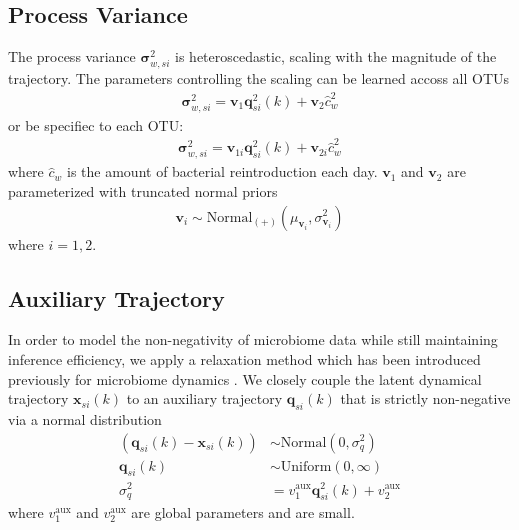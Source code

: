 \documentclass{article}
\newcommand{\var}{\sigma^2}
\newcommand{\Normaldist}{\text{Normal}}
\newcommand{\Uniformdist}{\text{Uniform}}
\newcommand{\x}[2]{\mathbf{x}_{#2}(#1)}
\newcommand{\q}[2]{\mathbf{q}_{#2}(#1)}
\newcommand{\qexp}[3]{\mathbf{q}^{#3}_{#2}(#1)}
\newcommand{\varcoupling}{\var_q}
\newcommand{\varw}[1]{\mathbf{\sigma}^2_{w,{}#1}}
\newcommand{\cw}{\hat{c}_w}
\renewcommand{\v}[1]{\mathbf{v}_{#1}}
\begin{document}
\subsection{Process Variance}
The process variance $\varw{si}$ is heteroscedastic, scaling with the magnitude of the trajectory. The parameters controlling the scaling can be learned accoss all OTUs
\begin{align}
  \varw{si} = \v{1} \qexp{k}{si}{2} + \v{2} \cw^2
\end{align}
or be specifiec to each OTU:
\begin{align}
  \varw{si} = \v{1i} \qexp{k}{si}{2} + \v{2i} \cw^2
\end{align}
where $\cw$ is the amount of bacterial reintroduction each day. $\v{1}$ and $\v{2}$ are parameterized with truncated normal priors
\begin{align}
  \v{i} \sim \Normaldist_{(+)} (\mu_{\v{i}}, \sigma^2_{\v{i}})
\end{align}
where $i=1,2$.

\subsection{Auxiliary Trajectory}
In order to model the non-negativity of microbiome data while still maintaining inference efficiency, we apply a relaxation method which has been introduced previously for microbiome dynamics \cite{cite:gibsonICML}. We closely couple the latent dynamical trajectory $\x{k}{si}$ to an auxiliary trajectory $\q{k}{si}$ that is strictly non-negative via a normal distribution
\begin{align}
  \label{eqn:x_q_coupling_var}
  ( \q{k}{si} - \x{k}{si} ) & \sim \Normaldist (0, \varcoupling) \\
  \q{k}{si} & \sim \Uniformdist (0, \infty) \\
  \varcoupling & = v_1^{\text{aux}}\qexp{k}{si}{2} + v_2^{\text{aux}}
\end{align}
where $v_1^{\text{aux}}$ and $v_2^{\text{aux}}$ are global parameters and are small.
\end{document}
